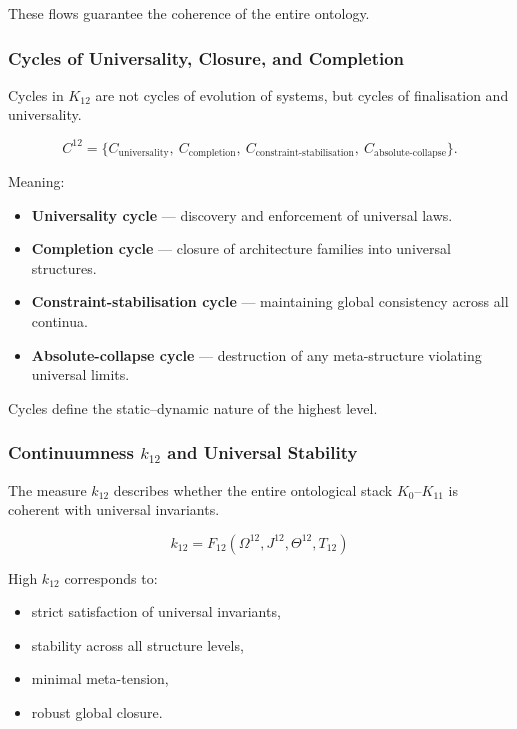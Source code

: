 These flows guarantee the coherence of the entire ontology.

\subsubsection{Cycles of Universality, Closure, and Completion}

Cycles in $K_{12}$ are not cycles of evolution of systems,
but cycles of finalisation and universality.

\[
C^{12} = \{
C_{\text{universality}},\
C_{\text{completion}},\
C_{\text{constraint-stabilisation}},\
C_{\text{absolute-collapse}}
\}.
\]

Meaning:
\begin{itemize}
    \item \textbf{Universality cycle}  
      --- discovery and enforcement of universal laws.

    \item \textbf{Completion cycle}  
      --- closure of architecture families into universal structures.

    \item \textbf{Constraint-stabilisation cycle}  
      --- maintaining global consistency across all continua.

    \item \textbf{Absolute-collapse cycle}  
      --- destruction of any meta-structure violating universal limits.
\end{itemize}

Cycles define the static--dynamic nature of the highest level.

\subsubsection{Continuumness $k_{12}$ and Universal Stability}

The measure $k_{12}$ describes whether
the entire ontological stack $K_0$--$K_{11}$ 
is coherent with universal invariants.

\[
k_{12} = F_{12}(\Omega^{12}, J^{12}, \Theta^{12}, T_{12})
\]

High $k_{12}$ corresponds to:
\begin{itemize}
    \item strict satisfaction of universal invariants,
    \item stability across all structure levels,
    \item minimal meta-tension,
    \item robust global closure.
\end{itemize}

